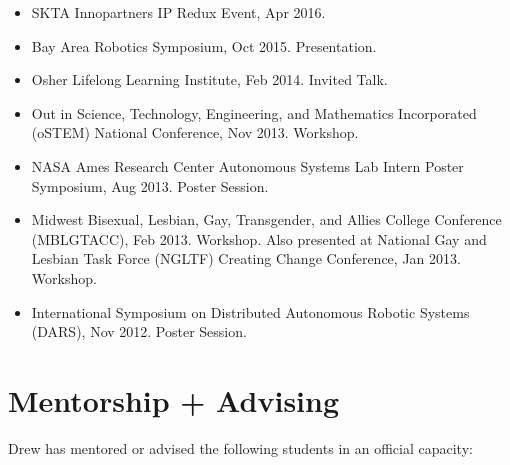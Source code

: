 \documentclass[letterpaper]{deedy-resume} %
\begin{document}
\vspace{0.2cm}
\begin{itemize}

\item {} SKTA Innopartners IP Redux Event, Apr 2016.

\item {} Bay Area Robotics Symposium, Oct 2015. Presentation.
  
\item {} Osher Lifelong Learning Institute, Feb 2014. Invited Talk.

\item {} Out in Science, Technology, Engineering, and Mathematics Incorporated (oSTEM) National Conference, Nov 2013. Workshop.

\item {} NASA Ames Research Center Autonomous Systems Lab Intern Poster Symposium, Aug 2013. Poster Session.

\item {} Midwest Bisexual, Lesbian, Gay, Transgender, and Allies College Conference (MBLGTACC), Feb 2013. Workshop. Also presented at National Gay and Lesbian Task Force (NGLTF) Creating Change Conference, Jan 2013. Workshop.

\item {} International Symposium on Distributed Autonomous Robotic Systems (DARS), Nov 2012. Poster Session.

\end{itemize}


  

\section{Mentorship + Advising}

\vspace{0.2cm}

Drew has mentored or advised the following students in an official capacity:
\end{document}
